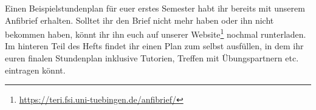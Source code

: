 Einen Beispielstundenplan für euer erstes Semester habt ihr bereits mit unserem Anfibrief erhalten. Solltet ihr den Brief nicht mehr haben oder ihn nicht bekommen haben, könnt ihr ihn euch auf unserer Website\footnote{\url{https://teri.fsi.uni-tuebingen.de/anfibrief/}} nochmal runterladen.\\
Im hinteren Teil des Hefts findet ihr einen Plan zum selbst ausfüllen, in dem ihr euren finalen Stundenplan inklusive Tutorien, Treffen mit Übungspartnern etc. eintragen könnt.

